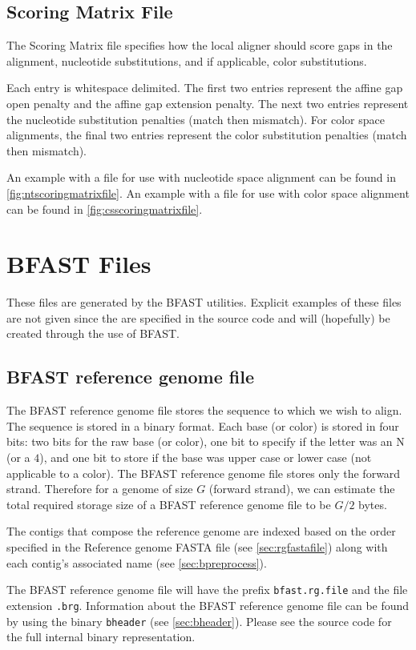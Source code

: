 \documentclass[a4paper,12pt]{book}
\newcommand{\TT}[1]{{\tt #1}} %
\newcommand{\RGFF}{Reference genome FASTA file}
\newcommand{\BRGF}{BFAST reference genome file} %
\begin{document}
\subsection{Scoring Matrix File}
\label{sec:scoringmatrixfile}
The Scoring Matrix file specifies how the local aligner should score gaps in the alignment, nucleotide substitutions, and if applicable, color substitutions.

Each entry is whitespace delimited.
The first two entries represent the affine gap open penalty and the affine gap extension penalty.
The next two entries represent the nucleotide substitution penalties (match then mismatch).
For color space alignments, the final two entries represent the color substitution penalties (match then mismatch).

An example with a file for use with nucleotide space alignment can be found in \autoref{fig:ntscoringmatrixfile}.
An example with a file for use with color space alignment can be found in \autoref{fig:csscoringmatrixfile}.

\section{BFAST Files}
These files are generated by the BFAST utilities. 
Explicit examples of these files are not given since the are specified in the source code and will (hopefully) be created through the use of BFAST.
\label{sec:bfastfiles}
\subsection{\BRGF{}}
\label{sec:brgf}
The \BRGF{} stores the sequence to which we wish to align.
The sequence is stored in a binary format.
Each base (or color) is stored in four bits: two bits for the raw base (or color), one bit to specify if the letter was an N (or a $4$), and one bit to store if the base was upper case or lower case (not applicable to a color).
The \BRGF{} stores only the forward strand.
Therefore for a genome of size $G$ (forward strand), we can estimate the total required storage size of a \BRGF{} to be $G/2$ bytes.

The contigs that compose the reference genome are indexed based on the order specified in the \RGFF{} (see \autoref{sec:rgfastafile}) along with each contig's associated name (see \autoref{sec:bpreprocess}).

The \BRGF{} will have the prefix \TT{bfast.rg.file} and the file extension \TT{.brg}.
Information about the \BRGF{} can be found by using the binary \TT{bheader} (see \autoref{sec:bheader}).
Please see the source code for the full internal binary representation.
\end{document}

